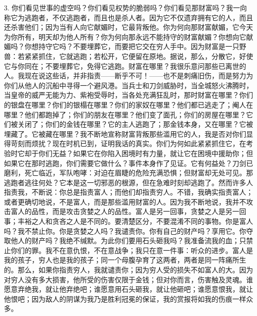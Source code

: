 3. 你们看见世事的虚空吗？你们看见权势的脆弱吗？你们看见那财富吗？我一向称它为逃跑者，不仅逃跑者，而且也是杀人者。因为它不仅遗弃拥有它的人，而且还杀害他们；因为当有人向它献媚时，它最背叛他。你为何向那财富献媚，它今天为你所有，明天却为他人所有？你为何向那永远不能持守的财富献媚？你想向它献媚吗？你想持守它吗？不要埋葬它，而要把它交在穷人手中。因为财富是一只野兽：若紧紧抓住，它就逃跑；若松开，它便留在原地。据说，那么，分散它，好使它与你同在；不要埋葬它，免得它逃跑。财富在哪里？我很乐意问那些已离世的人。我现在说这些话，并非指责——断乎不可！——也不是刺痛旧伤，而是努力为你们从他人的沉船中寻得一个避风港。当兵士和刀剑威胁时，当全城怒火沸腾时，当皇帝的威严无能为力、紫袍受辱时，当各处充满狂乱时，那时财富在哪里？你们的银盘在哪里？你们的银榻在哪里？你们的家奴在哪里？他们都已逃走了；阉人在哪里？他们都跑掉了；你们的朋友在哪里？他们变了面孔；你们的房屋在哪里？它们被关闭了；你们的金钱在哪里？它的主人逃跑了；那金钱本身，又在哪里？它被埋藏了。它被藏在哪里？我不断地宣称财富背叛那些滥用它的人，我是否对你们显得苛刻而烦扰？现在时机已到，证明我话的真实。你们为何如此紧紧抓住它，在考验时它却于你们无益？如果它在你陷入困境时有力量，就让它在困境中援助你；但如果它在那时逃跑，你们需要它做什么？事件本身作了见证。它有何益处？刀剑已磨利，死亡临近，军队咆哮：对迫在眉睫的危险充满恐惧；但财富却无处可见。那逃跑者逃往何处？它本是这一切邪恶的根源，但在急难时刻却逃跑了。然而许多人指责我，不断说：你总是指责富人；而他们却指责穷人。不错，我确实指责富人；或者更确切地说，不是富人，而是那些滥用财富的人。因为我不断地说，我并不攻击富人的品性，而是攻击贪婪之人的品性。富人是另一回事，贪婪之人是另一回事；丰裕之人和贪吝之人是不同的。要清楚区分，不要混淆不同的事物。你是富人吗？我不禁止你。你是贪婪之人吗？我谴责你。你有自己的财产吗？享用它。你夺取他人的财产吗？我绝不缄默。为此你们要用石头砸我吗？我准备流我的血；只禁止你们的罪。我不在意仇恨，不在意战争；我只在意一件事：听众的进步。富人是我的孩子，穷人也是我的孩子；同一个母腹孕育了这两者，两者是同一阵痛所生的。那么，如果你指责穷人，我就谴责你；因为穷人受的损失不如富人的大。因为对穷人没有多大损害，他所受的伤害仅限于金钱；但对你而言，伤害触及灵魂。谁愿意弃绝我，就让他弃绝吧；谁愿意用石头砸我，就让他砸吧；谁愿意恨我，就让他恨吧；因为敌人的阴谋为我乃是胜利冠冕的保证，我的赏报将如我的伤痕一样众多。\par

